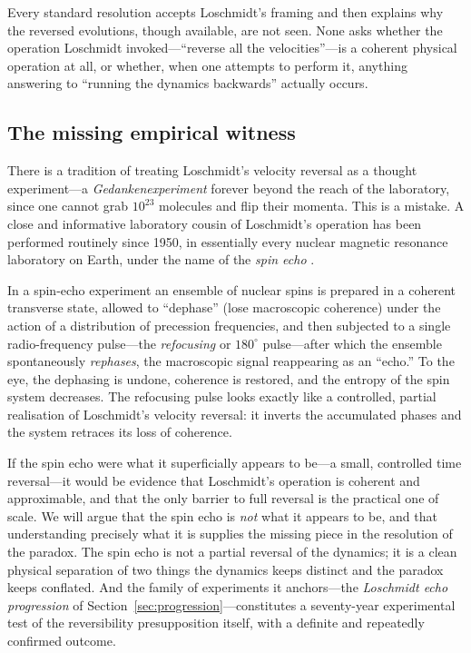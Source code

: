 \documentclass[11pt,a4paper]{article}
\theoremstyle{thmstyle}
\theoremstyle{definition}
\theoremstyle{remark}
\begin{document}
Every standard resolution accepts Loschmidt's framing and then explains
why the reversed evolutions, though available, are not seen. None asks
whether the operation Loschmidt invoked---``reverse all the
velocities''---is a coherent physical operation at all, or whether, when
one attempts to perform it, anything answering to ``running the dynamics
backwards'' actually occurs.

\subsection{The missing empirical witness}
\label{sec:missing-witness}

There is a tradition of treating Loschmidt's velocity reversal as a
thought experiment---a \emph{Gedankenexperiment} forever beyond the
reach of the laboratory, since one cannot grab $10^{23}$ molecules and
flip their momenta. This is a mistake. A close and informative
laboratory cousin of Loschmidt's operation has been performed routinely
since 1950, in essentially every nuclear magnetic resonance laboratory
on Earth, under the name of the \emph{spin echo} \citep{hahn1950}.

In a spin-echo experiment an ensemble of nuclear spins is prepared in a
coherent transverse state, allowed to ``dephase'' (lose macroscopic
coherence) under the action of a distribution of precession frequencies,
and then subjected to a single radio-frequency pulse---the
\emph{refocusing} or $180^{\circ}$ pulse---after which the ensemble
spontaneously \emph{rephases}, the macroscopic signal reappearing as an
``echo.'' To the eye, the dephasing is undone, coherence is restored,
and the entropy of the spin system decreases. The refocusing pulse looks
exactly like a controlled, partial realisation of Loschmidt's velocity
reversal: it inverts the accumulated phases and the system retraces its
loss of coherence.

If the spin echo were what it superficially appears to be---a small,
controlled time reversal---it would be evidence that Loschmidt's
operation is coherent and approximable, and that the only barrier to
full reversal is the practical one of scale. We will argue that the spin
echo is \emph{not} what it appears to be, and that understanding
precisely what it is supplies the missing piece in the resolution of the
paradox. The spin echo is not a partial reversal of the dynamics; it is
a clean physical separation of two things the dynamics keeps distinct
and the paradox keeps conflated. And the family of experiments it
anchors---the \emph{Loschmidt echo progression} of
Section~\ref{sec:progression}---constitutes a seventy-year experimental
test of the reversibility presupposition itself, with a definite and
repeatedly confirmed outcome.
\end{document}
